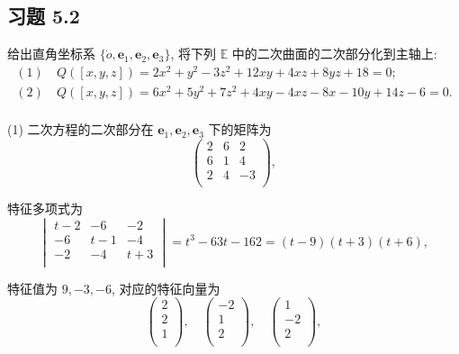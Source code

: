 \documentclass[color=black,device=normal,lang=cn,mode=geye]{elegantnote}
\begin{document}
\subsection{习题 5.2}
\begin{exercise}%
    给出直角坐标系 $\{\dot{o},\boldsymbol{e}_1,\boldsymbol{e}_2,\boldsymbol{e}_3\}$, 将下列 $\mathbb{E}$ 中的二次曲面的二次部分化到主轴上:
    \begin{align*}
        (1) &\ Q([x,y,z])=2x^2+y^2-3z^2+12xy+4xz+8yz+18=0; \\
        (2) &\ Q([x,y,z])=6x^2+5y^2+7z^2+4xy-4xz-8x-10y+14z-6=0. \\
    \end{align*}
\end{exercise}
\begin{solution}
    (1) 二次方程的二次部分在 $\boldsymbol{e}_1,\boldsymbol{e}_2,\boldsymbol{e}_3$ 下的矩阵为
    \[\begin{pmatrix}
        2 & 6 & 2 \\
        6 & 1 & 4 \\
        2 & 4 & -3 \\
    \end{pmatrix},\]

    特征多项式为
    \[\begin{vmatrix}
        t-2 & -6 & -2 \\
        -6 & t-1 & -4 \\
        -2 & -4 & t+3 \\
    \end{vmatrix}=t^3-63t-162=(t-9)(t+3)(t+6),\]

    特征值为 $9,-3,-6$, 对应的特征向量为
    \[\begin{pmatrix}
        2 \\
        2 \\
        1 \\
    \end{pmatrix},\quad\begin{pmatrix}
        -2 \\
        1 \\
        2 \\
    \end{pmatrix},\quad\begin{pmatrix}
        1 \\
        -2 \\
        2 \\
    \end{pmatrix},\]


\end{solution}
\end{document}
